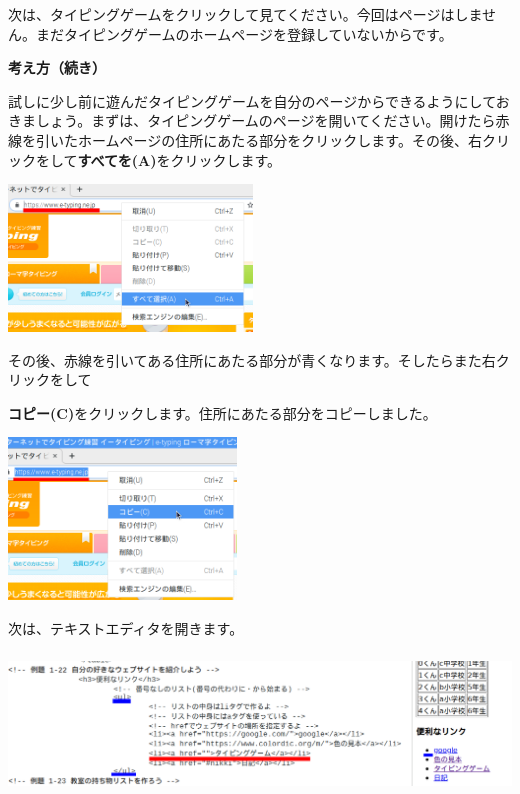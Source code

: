 \documentclass[a4paper,12pt]{jarticle}
\begin{document}
\bigskip

\flushleft
次は、タイピングゲームをクリックして見てください。今回はページはしません。まだタイピングゲームのホームページを登録していないからです。


\clearpage
\textbf{考え方（続き）}



試しに少し前に遊んだタイピングゲームを自分のページからできるようにしておきましょう。まずは、タイピングゲームのページを開いてください。開けたら赤線を引いたホームページの住所にあたる部分をクリックします。その後、右クリックをして\textbf{すべてを(A)}をクリックします。


\bigskip

\centering
\includegraphics[width=6.495cm,height=3.914cm]{textbook-img196.png}

\flushleft

その後、赤線を引いてある住所にあたる部分が青くなります。そしたらまた右クリックをして

\textbf{コピー(C)}をクリックします。住所にあたる部分をコピーしました。

\centering
\includegraphics[width=6.064cm,height=4.311cm]{textbook-img197.png}

\bigskip
\flushleft

次は、テキストエディタを開きます。

\centering
\includegraphics[width=15.157cm,height=3.755cm]{textbook-img198.png}
\end{document}
